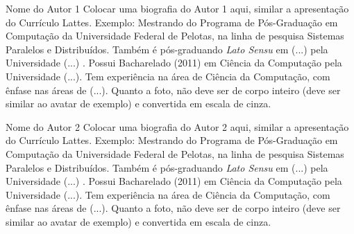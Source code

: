\documentclass[12pt,article,compsoc]{IEEEtran}
\begin{document}
\begin{IEEEbiography}{Nome do Autor 1}
Colocar uma biografia do Autor 1 aqui, similar a apresentação do Currículo Lattes. Exemplo: Mestrando do Programa de Pós-Graduação em Computação da Universidade Federal de Pelotas, na linha de pesquisa Sistemas Paralelos e Distribuídos. Também é pós-graduando \textit{Lato Sensu} em (...) pela Universidade (...) . Possui Bacharelado (2011) em Ciência da Computação pela Universidade (...). Tem experiência na área de Ciência da Computação, com ênfase nas áreas de (...).
Quanto a foto, não deve ser de corpo inteiro (deve ser similar ao avatar de exemplo) e convertida em escala de cinza.
\end{IEEEbiography}


\begin{IEEEbiography}{Nome do Autor 2}
Colocar uma biografia do Autor 2 aqui, similar a apresentação do Currículo Lattes. Exemplo: Mestrando do Programa de Pós-Graduação em Computação da Universidade Federal de Pelotas, na linha de pesquisa Sistemas Paralelos e Distribuídos. Também é pós-graduando \textit{Lato Sensu} em (...) pela Universidade (...) . Possui Bacharelado (2011) em Ciência da Computação pela Universidade (...). Tem experiência na área de Ciência da Computação, com ênfase nas áreas de (...).
Quanto a foto, não deve ser de corpo inteiro (deve ser similar ao avatar de exemplo) e convertida em escala de cinza.
\end{IEEEbiography}
\end{document}

